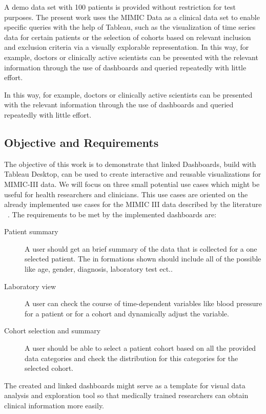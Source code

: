 \documentclass[aac,crcready]{iosart2x}
\begin{document}
A demo data set with 100 patients is provided without restriction for test purposes. 
The present work uses the MIMIC Data as a clinical data set to enable specific queries with the help of Tableau, such as the visualization of time series data for certain patients or the selection of cohorts based on relevant inclusion and exclusion criteria via a visually explorable representation. In this way, for example, doctors or clinically active scientists can be presented with the relevant information through the use of dashboards and queried repeatedly with little effort.

In this way, for example, doctors or clinically active scientists can be presented with the relevant information through the use of dashboards and queried repeatedly with little effort.

\subsection{Objective and Requirements}\label{s1.2}
%
The objective of this work is to demonstrate that linked Dashboards, build with Tableau Desktop, can be used to create interactive and reusable visualizations for MIMIC-III data. We will focus on three small potential use cases which might be useful for health researchers and clinicians. This use cases are oriented on the already implemented use cases for the MIMIC III data described by the literature ~\cite{Lee.2016, Festag.2019}.
The requirements to be met by the implemented dashboards are:
\begin{description}
\item[Patient summary] A user should get an brief summary of the data that is collected for a one selected patient. The in formations shown should include all of the possible   like age, gender, diagnosis, laboratory test ect..
\item[Laboratory view] A user can check the course of time-dependent variables like blood pressure for a patient or for a cohort and dynamically adjust the variable.
\item[Cohort selection and summary] A user should be able to select a patient cohort based on all the provided data categories and check the distribution for this categories for the selected cohort.
\end{description}

The created and linked dashboards might serve as a template for visual data analysis and exploration tool so that medically trained researchers can obtain clinical information more easily.
\end{document}
